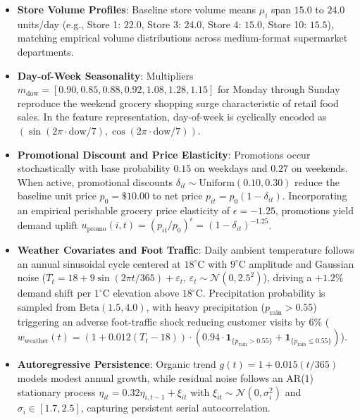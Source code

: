 \documentclass[11pt,a4paper]{article}
\theoremstyle{definition}
\theoremstyle{remark}
\begin{document}
\begin{itemize}[leftmargin=*]
    \item \textbf{Store Volume Profiles}: Baseline store volume means $\mu_i$ span $15.0$ to $24.0$ units/day (e.g., Store 1: $22.0$, Store 3: $24.0$, Store 4: $15.0$, Store 10: $15.5$), matching empirical volume distributions across medium-format supermarket departments.
    \item \textbf{Day-of-Week Seasonality}: Multipliers $m_{\text{dow}} = [0.90, 0.85, 0.88, 0.92, 1.08, 1.28, 1.15]$ for Monday through Sunday reproduce the weekend grocery shopping surge characteristic of retail food sales. In the feature representation, day-of-week is cyclically encoded as $(\sin(2\pi \cdot \text{dow}/7), \cos(2\pi \cdot \text{dow}/7))$.
    \item \textbf{Promotional Discount and Price Elasticity}: Promotions occur stochastically with base probability $0.15$ on weekdays and $0.27$ on weekends. When active, promotional discounts $\delta_{it} \sim \text{Uniform}(0.10, 0.30)$ reduce the baseline unit price $p_0 = \$10.00$ to net price $p_{it} = p_0(1 - \delta_{it})$. Incorporating an empirical perishable grocery price elasticity of $\epsilon = -1.25$, promotions yield demand uplift $u_{\text{promo}}(i, t) = (p_{it}/p_0)^{\epsilon} = (1 - \delta_{it})^{-1.25}$.
    \item \textbf{Weather Covariates and Foot Traffic}: Daily ambient temperature follows an annual sinusoidal cycle centered at $18^\circ\text{C}$ with $9^\circ\text{C}$ amplitude and Gaussian noise ($T_t = 18 + 9\sin(2\pi t / 365) + \varepsilon_t$, $\varepsilon_t \sim \mathcal{N}(0, 2.5^2)$), driving a $+1.2\%$ demand shift per $1^\circ\text{C}$ elevation above $18^\circ\text{C}$. Precipitation probability is sampled from $\text{Beta}(1.5, 4.0)$, with heavy precipitation ($p_{\text{rain}} > 0.55$) triggering an adverse foot-traffic shock reducing customer visits by $6\%$ ($w_{\text{weather}}(t) = (1 + 0.012(T_t - 18))\cdot (0.94 \cdot \mathbf{1}_{\{p_{\text{rain}}>0.55\}} + \mathbf{1}_{\{p_{\text{rain}}\le 0.55\}})$).
    \item \textbf{Autoregressive Persistence}: Organic trend $g(t) = 1 + 0.015(t/365)$ models modest annual growth, while residual noise follows an AR(1) stationary process $\eta_{it} = 0.32 \eta_{i, t-1} + \xi_{it}$ with $\xi_{it} \sim \mathcal{N}(0, \sigma_i^2)$ and $\sigma_i \in [1.7, 2.5]$, capturing persistent serial autocorrelation.
\end{itemize}
\end{document}
